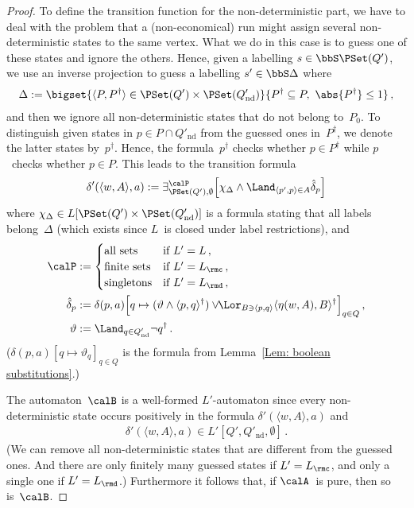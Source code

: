 \documentclass[10pt, fleqn]{scrartcl}
\newcommand*{\?}{\kern .08em}
\begin{document}
\begin{proof}
To define the transition function for the non-deterministic part, we have to deal with
the problem that a (non-economical) run might assign several non-deterministic states
to the same vertex. What we do in this case is to guess one of these states and ignore the
others. Hence, given a labelling $s \in \bbS\PSet(Q')$, we use an inverse projection
to guess a labelling $s' \in \bbS\Delta$ where
\begin{align*}
  \Delta :=
    \bigset{ \langle P,P^\dag\rangle \in \PSet(Q') \times \PSet(Q'_{\mathrm{nd}}) }
           { P^\dag \subseteq P,\ \abs{P^\dag} \leq 1 }\,,
\end{align*}
and then we ignore all non-deterministic states that do not belong to~$P_0$.
To distinguish given states in $p \in P \cap Q'_{\mathrm{nd}}$ from the guessed ones
in~$P^\dag$, we denote the latter states by~$p^\dag$. Hence, the formula~$p^\dag$ checks
whether $p \in P^\dag$ while $p$~checks whether $p \in P$.
This leads to the transition formula
\begin{align*}
  \delta'(\langle w,A\rangle,a) :=
    \exists^\calP_{\PSet(Q'),\emptyset}
      \Bigl[\chi_\Delta \land \Land_{\langle p',p\rangle \in A}\hat\delta_p\Bigr]
\end{align*}
where $\chi_\Delta \in L[\PSet(Q') \times \PSet(Q'_{\mathrm{nd}})]$ is a formula stating that
all labels belong~$\Delta$ (which exists since $L$~is closed under label restrictions), and
\begin{align*}
  \calP &:= \begin{cases}
              \text{all sets}    &\text{if } L' = L\,, \\
              \text{finite sets} &\text{if } L' = L_\rmc\,, \\
              \text{singletons}  &\text{if } L' = L_\rmd\,,
            \end{cases} \\
  \hat\delta_p &:=
    \delta(p,a)\Bigl[q \mapsto (\vartheta \land \langle p,q\rangle^\dag)
                          \lor\!\! \Lor_{B \owns \langle p,q\rangle} \langle \eta(w,A),B\rangle^\dag
                     \Bigr]_{q \in Q}\,, \\
  \vartheta &:= \Land_{q \in Q'_{\mathrm{nd}}} \neg q^\dag\,.
\end{align*}
($\delta(p,a)[q \mapsto \vartheta_q]_{q \in Q}$ is the formula from
Lemma~\ref{Lem: boolean substitutions}.)

The automaton~$\calB$ is a well-formed $L'$-automaton since every non-deterministic state
occurs positively in the formula $\delta'(\langle w,A\rangle,a)$ and
\begin{align*}
  \delta'(\langle w,A\rangle,a) \in L'[Q',Q'_{\mathrm{nd}},\emptyset]\,.
\end{align*}
(We can remove all non-deterministic states that are different from the guessed ones.
And there are only finitely many guessed states if $L' = L_\rmc$,
and only a single one if $L' = L_\rmd$.)
Furthermore it follows that, if $\calA$~is pure, then so is~$\calB$.


\end{proof}
\end{document}
